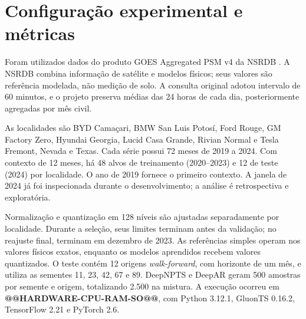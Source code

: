 \documentclass[10pt,conference,a4paper]{IEEEtran}
\begin{document}
\noindent{}

\section{Configuração experimental e métricas}
\label{sec:configuracao}

Foram utilizados dados do produto GOES Aggregated PSM v4 da NSRDB
\cite{sengupta2018,nlr2026}. A NSRDB combina informação de satélite e modelos
físicos; seus valores são referência modelada, não medição de solo. A consulta
original adotou intervalo de 60 minutos, e o projeto preserva médias das 24
horas de cada dia, posteriormente agregadas por mês civil.

As localidades são BYD Camaçari, BMW San Luis Potosí, Ford Rouge, GM Factory
Zero, Hyundai Georgia, Lucid Casa Grande, Rivian Normal e Tesla Fremont, Nevada
e Texas. Cada série possui 72 meses de 2019 a 2024. Com contexto de 12 meses,
há 48 alvos de treinamento (2020--2023) e 12 de teste (2024) por localidade.
O ano de 2019 fornece o primeiro contexto. A janela de 2024 já foi inspecionada
durante o desenvolvimento; a análise é retrospectiva e exploratória.

Normalização e quantização em 128 níveis são ajustadas separadamente por
localidade. Durante a seleção, seus limites terminam antes da validação; no
reajuste final, terminam em dezembro de 2023. As referências simples operam nos
valores físicos exatos, enquanto os modelos aprendidos recebem valores
quantizados. O teste contém 12 origens \textit{walk-forward}, com horizonte de
um mês, e utiliza as sementes 11, 23, 42, 67 e 89. DeepNPTS e DeepAR geram 500
amostras por semente e origem, totalizando 2.500 na mistura. A execução ocorreu
em \textbf{@@HARDWARE-CPU-RAM-SO@@}, com Python 3.12.1, GluonTS 0.16.2,
TensorFlow 2.21 e PyTorch 2.6.
\end{document}
